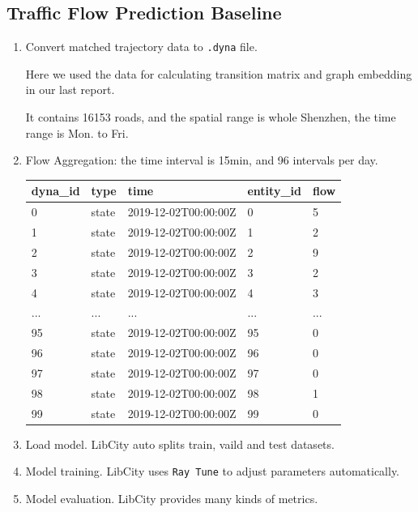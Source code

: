 \documentclass[fontset=none]{ctexart}
\theoremstyle{definition}
\theoremstyle{remark}
\begin{document}
\subsection{Traffic Flow Prediction Baseline}
\begin{enumerate}
  \item Convert matched trajectory data to \texttt{.dyna} file.

        Here we used the data for calculating transition matrix and graph embedding in our last report.

        It contains 16153 roads, and the spatial range is whole Shenzhen, the time range is Mon. to Fri.
  \item Flow Aggregation: the time interval is 15min, and 96 intervals per day.
        \begin{table}[!ht]
          \centering
          \begin{tabular}{|l|l|l|l|l|}
          \hline
              dyna\_id & type & time & entity\_id & flow \\ \hline
              0 & state & 2019-12-02T00:00:00Z & 0 & 5 \\ \hline
              1 & state & 2019-12-02T00:00:00Z & 1 & 2 \\ \hline
              2 & state & 2019-12-02T00:00:00Z & 2 & 9 \\ \hline
              3 & state & 2019-12-02T00:00:00Z & 3 & 2 \\ \hline
              4 & state & 2019-12-02T00:00:00Z & 4 & 3 \\ \hline
              ... & ... & ... & ... & ... \\ \hline
              95 & state & 2019-12-02T00:00:00Z & 95 & 0 \\ \hline
              96 & state & 2019-12-02T00:00:00Z & 96 & 0 \\ \hline
              97 & state & 2019-12-02T00:00:00Z & 97 & 0 \\ \hline
              98 & state & 2019-12-02T00:00:00Z & 98 & 1 \\ \hline
              99 & state & 2019-12-02T00:00:00Z & 99 & 0 \\ \hline
          \end{tabular}
      \end{table}
  \item Load model. LibCity auto splits train, vaild and test datasets.
  \item Model training. LibCity uses \texttt{Ray Tune} to adjust parameters automatically.
  \item Model evaluation. LibCity provides many kinds of metrics.
\end{enumerate}
\end{document}
